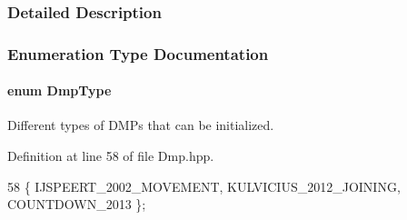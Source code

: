 \subsubsection{Detailed Description}


\subsubsection{Enumeration Type Documentation}
\hypertarget{group__Dmps_gaccba8d09ec99ae66e469b3511bb232a4}{
\paragraph[{Dmp\+Type}]{\setlength{\rightskip}{0pt plus 5cm}enum Dmp\+Type}}\label{group__Dmps_gaccba8d09ec99ae66e469b3511bb232a4}


Different types of D\+M\+Ps that can be initialized. 



Definition at line 58 of file Dmp.\+hpp.


\begin{DoxyCode}
58 \{ IJSPEERT\_2002\_MOVEMENT, KULVICIUS\_2012\_JOINING, COUNTDOWN\_2013  \};
\end{DoxyCode}
